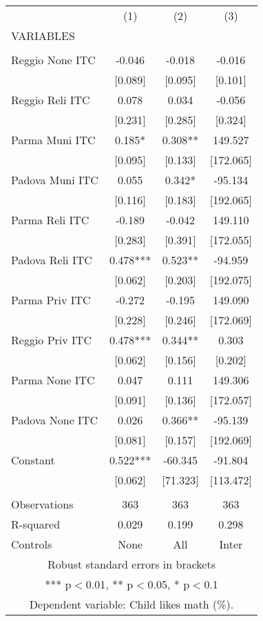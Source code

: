 \begin{tabular}{lccc} \hline
 & (1) & (2) & (3) \\
VARIABLES &  &  &  \\ \hline
 &  &  &  \\
Reggio None ITC & -0.046 & -0.018 & -0.016 \\
 & [0.089] & [0.095] & [0.101] \\
Reggio Reli ITC & 0.078 & 0.034 & -0.056 \\
 & [0.231] & [0.285] & [0.324] \\
Parma Muni ITC & 0.185* & 0.308** & 149.527 \\
 & [0.095] & [0.133] & [172.065] \\
Padova Muni ITC & 0.055 & 0.342* & -95.134 \\
 & [0.116] & [0.183] & [192.065] \\
Parma Reli ITC & -0.189 & -0.042 & 149.110 \\
 & [0.283] & [0.391] & [172.055] \\
Padova Reli ITC & 0.478*** & 0.523** & -94.959 \\
 & [0.062] & [0.203] & [192.075] \\
Parma Priv ITC & -0.272 & -0.195 & 149.090 \\
 & [0.228] & [0.246] & [172.069] \\
Reggio Priv ITC & 0.478*** & 0.344** & 0.303 \\
 & [0.062] & [0.156] & [0.202] \\
Parma None ITC & 0.047 & 0.111 & 149.306 \\
 & [0.091] & [0.136] & [172.057] \\
Padova None ITC & 0.026 & 0.366** & -95.139 \\
 & [0.081] & [0.157] & [192.069] \\
Constant & 0.522*** & -60.345 & -91.804 \\
 & [0.062] & [71.323] & [113.472] \\
 &  &  &  \\
Observations & 363 & 363 & 363 \\
R-squared & 0.029 & 0.199 & 0.298 \\
 Controls & None & All & Inter \\ \hline
\multicolumn{4}{c}{ Robust standard errors in brackets} \\
\multicolumn{4}{c}{ *** p$<$0.01, ** p$<$0.05, * p$<$0.1} \\
\multicolumn{4}{c}{ Dependent variable: Child likes math (\%).} \\
\end{tabular}
